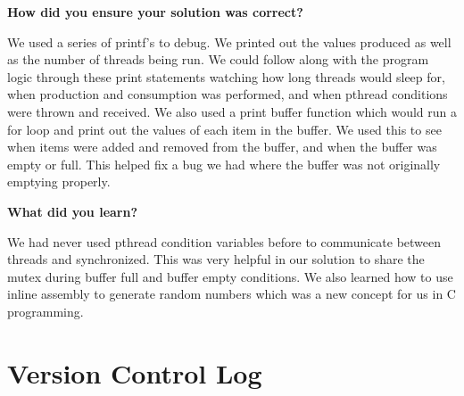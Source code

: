 \documentclass[10pt,letterpaper,draftclsnofoot,onecolumn]{IEEEtran}
\begin{document}
\noindent\textbf{How did you ensure your solution was correct?}
\medskip

\noindent We used a series of printf's to debug. We printed out the values produced as well as the number of threads being run. We could follow along with the program logic through these print statements watching how long threads would sleep for, when production and consumption was performed, and when pthread conditions were thrown and received. We also used a print buffer function which would run a for loop and print out the values of each item in the buffer. We used this to see when items were added and removed from the buffer, and when the buffer was empty or full. This helped fix a bug we had where the buffer was not originally emptying properly.\par
\medskip

\bigskip

\noindent\textbf{What did you learn?}
\medskip

\noindent We had never used pthread condition variables before to communicate between threads and synchronized. This was very helpful in our solution to share the mutex during buffer full and buffer empty conditions. We also learned how to use inline assembly to generate random numbers which was a new concept for us in C programming.\par
\bigskip

\section{Version Control  Log}
\bigskip
\end{document}
